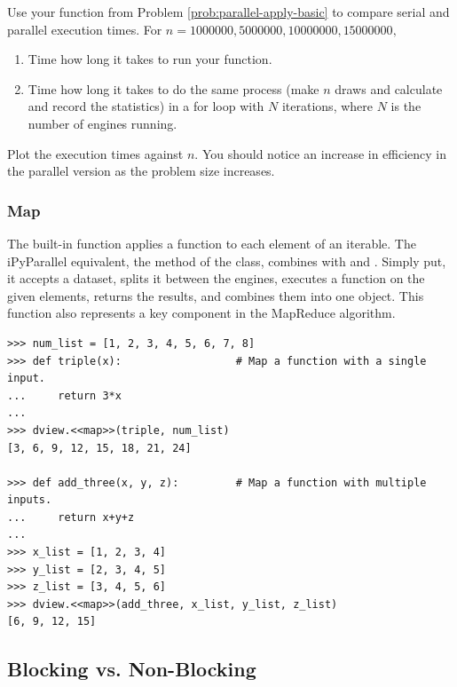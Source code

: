 \begin{problem}
Use your function from Problem \ref{prob:parallel-apply-basic} to compare serial and parallel execution times.
For $n = 1000000, 5000000, 10000000, 15000000,$
\begin{enumerate}
\item Time how long it takes to run your function.
\item Time how long it takes to do the same process (make $n$ draws and calculate and record the statistics) in a for loop with $N$ iterations, where $N$ is the number of engines running.
\end{enumerate}
Plot the execution times against $n$.
You should notice an increase in efficiency in the parallel version as the problem size increases.
\end{problem}

\subsubsection*{Map} %

The built-in  function applies a function to each element of an iterable.
The iPyParallel equivalent, the  method of the  class, combines  with  and .
Simply put, it accepts a dataset, splits it between the engines, executes a function on the given elements, returns the results, and combines them into one object.
This function also represents a key component in the MapReduce algorithm.


\begin{lstlisting}
>>> num_list = [1, 2, 3, 4, 5, 6, 7, 8]
>>> def triple(x):                  # Map a function with a single input.
...     return 3*x
...
>>> dview.<<map>>(triple, num_list)
[3, 6, 9, 12, 15, 18, 21, 24]

>>> def add_three(x, y, z):         # Map a function with multiple inputs.
...     return x+y+z
...
>>> x_list = [1, 2, 3, 4]
>>> y_list = [2, 3, 4, 5]
>>> z_list = [3, 4, 5, 6]
>>> dview.<<map>>(add_three, x_list, y_list, z_list)
[6, 9, 12, 15]
\end{lstlisting}


\subsection*{Blocking vs. Non-Blocking} %

